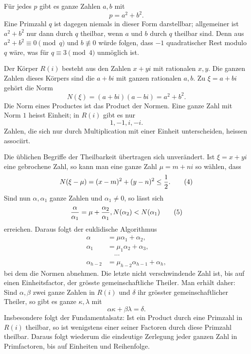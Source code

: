 \documentclass[11pt]{article}
\begin{document}
Für jedes $p$ gibt es ganze Zahlen $a,b$ mit
\[
        p=a^2+b^2.                                                      \tag{1}
\]
Eine Primzahl $q$ ist dagegen niemals in dieser Form darstellbar; allgemeiner ist $a^2+b^2$ nur dann durch $q$ theilbar, wenn $a$ und $b$ durch $q$ theilbar sind. Denn aus $a^2+b^2\equiv0\pmod q$ und $b\not\equiv0$ würde folgen, dass $-1$ quadratischer Rest modulo $q$ wäre, was für $q\equiv3\pmod4$ unmöglich ist.

Der Körper $R(i)$ besteht aus den Zahlen $x+yi$ mit rationalen $x,y$. Die ganzen Zahlen dieses Körpers sind die $a+bi$ mit ganzen rationalen $a,b$. Zu $\xi=a+bi$ gehört die Norm
\[
        N(\xi)=(a+bi)(a-bi)=a^2+b^2.                                  \tag{2}
\]
Die Norm eines Productes ist das Product der Normen. Eine ganze Zahl mit Norm $1$ heisst Einheit; in $R(i)$ gibt es nur
\[
        1,
        -1,
        i,
        -i.                                                            \tag{3}
\]
Zahlen, die sich nur durch Multiplication mit einer Einheit unterscheiden, heissen associirt.

Die üblichen Begriffe der Theilbarkeit übertragen sich unverändert. Ist $\xi=x+yi$ eine gebrochene Zahl, so kann man eine ganze Zahl $\mu=m+ni$ so wählen, dass
\[
        N(\xi-
\mu)=(x-m)^2+(y-n)^2\le {1\over2}.                         \tag{4}
\]
Sind nun $\alpha,
\alpha_1$ ganze Zahlen und $\alpha_1\ne0$, so lässt sich
\[
        {\alpha\over\alpha_1}=\mu+{\alpha_2\over\alpha_1},
        N(\alpha_2)<N(\alpha_1)                                      \tag{5}
\]
erreichen. Daraus folgt der euklidische Algorithmus
\[
\begin{aligned}
\alpha&=\mu\alpha_1+
\alpha_2,\\
\alpha_1&=\mu_1\alpha_2+
\alpha_3,\\
&\hspace{1em}\cdots\\
\alpha_{h-2}&=\mu_{h-2}\alpha_{h-1}+
\alpha_h,
\end{aligned}                                                          \tag{6}
\]
bei dem die Normen abnehmen. Die letzte nicht verschwindende Zahl ist, bis auf einen Einheitsfactor, der grösste gemeinschaftliche Theiler. Man erhält daher: Sind $\alpha,
\beta$ zwei ganze Zahlen in $R(i)$ und $\delta$ ihr grösster gemeinschaftlicher Theiler, so gibt es ganze $\kappa,
\lambda$ mit
\[
        \alpha\kappa+
\beta\lambda=\delta.                              \tag{7}
\]
Insbesondere folgt der Fundamentalsatz: Ist ein Product durch eine Primzahl in $R(i)$ theilbar, so ist wenigstens einer seiner Factoren durch diese Primzahl theilbar. Daraus folgt wiederum die eindeutige Zerlegung jeder ganzen Zahl in Primfactoren, bis auf Einheiten und Reihenfolge.
\end{document}
